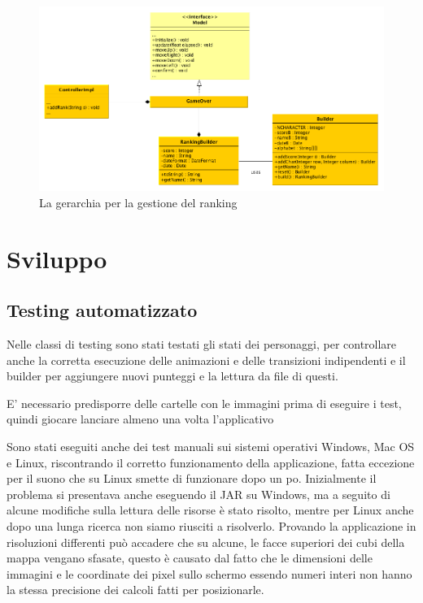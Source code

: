 \documentclass[a4paper,12pt, hidelinks]{report}
\begin{document}
\begin{figure}[H]
\centering{}
\includegraphics[width=\linewidth]{img/PatternBuilder}
\caption{La gerarchia per la gestione del ranking}
\label{img:PatternBuilder}
\end{figure}


\chapter{Sviluppo}
\section{Testing automatizzato}

Nelle classi di testing sono stati testati gli stati dei personaggi, per controllare anche la corretta esecuzione delle animazioni e delle transizioni indipendenti e il builder per aggiungere nuovi punteggi e la lettura da file di questi.

E' necessario predisporre delle cartelle con le immagini prima di eseguire i test, quindi giocare lanciare almeno una volta l'applicativo

Sono stati eseguiti anche dei test manuali sui sistemi operativi Windows, Mac OS e Linux, riscontrando il corretto funzionamento della applicazione, fatta eccezione per il suono che su Linux smette di funzionare dopo un po. Inizialmente il problema si presentava anche eseguendo il JAR su Windows, ma a seguito di alcune modifiche sulla lettura delle risorse è stato risolto, mentre per Linux anche dopo una lunga ricerca non siamo riusciti a risolverlo. Provando la applicazione in risoluzioni differenti può accadere che su alcune, le facce superiori dei cubi della mappa vengano sfasate, questo è causato dal fatto che le dimensioni delle immagini e le coordinate dei pixel sullo schermo essendo numeri interi non hanno la stessa precisione dei calcoli fatti per posizionarle.
\end{document}
